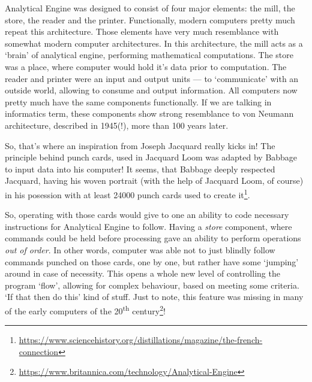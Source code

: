 \documentclass{article}
\begin{document}
            Analytical Engine was designed to consist of four major elements: the mill, the store, the reader and the printer. Functionally, modern computers pretty much
            repeat this architecture. Those elements have very much resemblance with somewhat modern computer architectures. In this architecture, the mill acts as a `brain'
            of analytical engine, performing mathematical computations. The store was a place, where computer would hold it's data prior to computation. The reader and printer
            were an input and output units --- to `communicate' with an outside world, allowing to consume and output information. All computers now pretty much have the same 
            components functionally. If we are talking in informatics term, these components show strong resemblance to von Neumann architecture, described in 1945(!), more than
            100 years later. \par

            So, that's where an inspiration from Joseph Jacquard really kicks in! The principle behind punch cards, used in Jacquard Loom was adapted by Babbage to input data
            into his computer! It seems, that Babbage deeply respected Jacquard, having his woven portrait (with the help of Jacquard Loom, of course) in his 
            posession with at least \num{24000} punch cards used to create it\footnote{\href{https://www.sciencehistory.org/distillations/magazine/the-french-connection}
            {https://www.sciencehistory.org/distillations/magazine/the-french-connection}}. \par

            So, operating with those cards would give to one an ability to code necessary instructions for Analytical Engine to follow. Having a \emph{store} component, 
            where commands could be held before processing gave an ability to perform operations \emph{out of order}. In other words, computer was able not to just blindly
            follow commands punched on those cards, one by one, but rather have some `jumping' around in case of necessity. This opens a whole new level of controlling the
            program `flow', allowing for complex behaviour, based on meeting some criteria. `If that then do this' kind of stuff. Just to note, this feature was missing
            in many of the early computers of the 20\textsuperscript{th} century\footnote{\href{https://www.britannica.com/technology/Analytical-Engine}
            {https://www.britannica.com/technology/Analytical-Engine}}! \par
\end{document}
